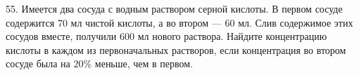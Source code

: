 55. Имеется два сосуда с водным раствором серной кислоты. В первом сосуде содержится 70 мл чистой кислоты, а во втором --- 60 мл. Слив содержимое этих сосудов вместе, получили 600 мл нового раствора. Найдите концентрацию кислоты в каждом из первоначальных растворов, если концентрация во втором сосуде была на $20\%$ меньше, чем в первом.\\
